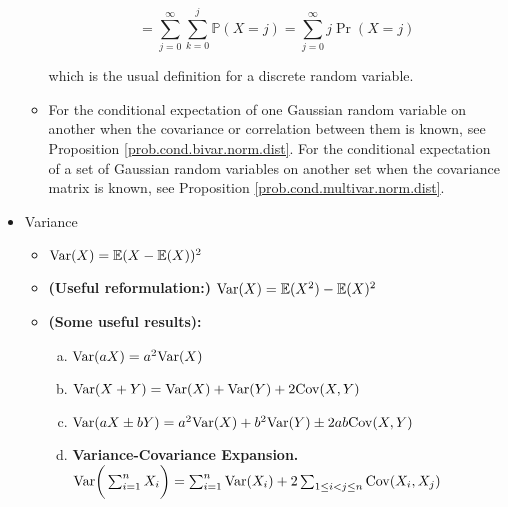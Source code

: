 \begin{itemize}
\begin{itemize}
\begin{theorem}
\begin{remark}
\[
= \sum_{j=0}^\infty \sum_{k=0}^j \mathbb{P}(X=j) = \sum_{j=0}^\infty j \Pr(X=j)
\]

which is the usual definition for a discrete random variable.

\end{remark}

\end{theorem}

\item For the conditional expectation of one Gaussian random variable on another when the covariance or correlation between them is known, see Proposition \ref{prob.cond.bivar.norm.dist}. For the conditional expectation of a set of Gaussian random variables on another set when the covariance matrix is known, see Proposition \ref{prob.cond.multivar.norm.dist}. 

\end{itemize}

\item Variance

\begin{itemize}

\item \begin{definition} \( \mathrm{Var}(X) = \mathbb{E}(X - \mathbb{E}(X))^2\) \end{definition}

\item \begin{proposition} \textbf{(Useful reformulation:)} \(\mathrm{Var}(X) = \mathbb{E}(X^2) - \mathbb{E}(X)^2\) \end{proposition}

\item \begin{theorem} \textbf{(Some useful results):} 


\begin{enumerate}[(a)]

\item \(\mathrm{Var}(aX) = a^2 \mathrm{Var}(X)\)

\item \(\mathrm{Var}(X + Y) = \mathrm{Var}(X) + \mathrm{Var}(Y) + 2 \mathrm{Cov}(X, Y)\)

\item \(\mathrm{Var}(aX \pm bY) = a^2\mathrm{Var}(X) + b^2\mathrm{Var}(Y) \pm 2ab \mathrm{Cov}(X, Y)\) 

\item \textbf{Variance-Covariance Expansion.}  \(\mathrm{Var} \bigg( \sum_{i=1}^n X_i \bigg) = \sum_{i=1}^n \mathrm{Var}(X_i) + 2 \sum_{1 \leq i < j \leq n} \mathrm{Cov}(X_i, X_j)\)

%


\end{enumerate}
\end{theorem}
\end{itemize}
\end{itemize}
